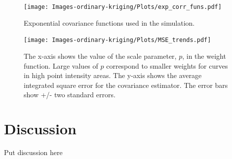 \begin{figure}
	\begin{center}
		\texttt{[image: Images-ordinary-kriging/Plots/exp\_corr\_funs.pdf]} 
	\end{center}
	\caption{Exponential covariance functions used in the simulation.} \label{fig:exp_corr_funs} 
\end{figure}

\begin{figure}
	\begin{center}
		\texttt{[image: Images-ordinary-kriging/Plots/MSE\_trends.pdf]} 
	\end{center}
	\caption{The x-axis shows the value of the scale parameter, $p$, in the weight function. Large values of $p$ correspond to smaller weights for curves in high point intensity areas. The y-axis shows the average integrated square error for the covariance estimator. The error bars show +/- two standard errors.} \label{fig:MSE_trends} 
\end{figure}

\section{Discussion} %
\label{sec:discussion}
Put discussion here \cite{cressie1993statistics}

